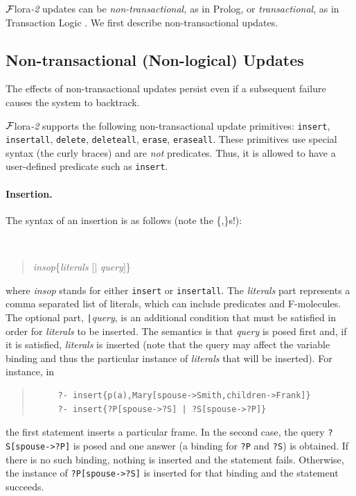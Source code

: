 \documentclass[11pt]{article}
\newcommand{\FLORA}{{\mbox{\sc ${\cal F}${lora}\rm\emph{-2}}}\xspace}
\begin{document}
\FLORA updates can be \emph{non-transactional,} as in Prolog, or
\emph{transactional}, as in Transaction Logic
\cite{trans-chapter-98,trans-tcs94}.  We first describe non-transactional
updates.


\subsection{Non-transactional (Non-logical) Updates}
\label{sec:non-transactional-updates}

%
The effects of non-transactional updates persist even if a subsequent failure
causes the system to backtrack.

\FLORA supports the following non-transactional update primitives:
{\tt insert}, {\tt insertall}, {\tt delete}, {\tt deleteall},
{\tt erase}, {\tt eraseall}. These primitives use special syntax (the curly
braces) and are \emph{not} predicates. Thus, it is allowed to have a
user-defined predicate such as {\tt insert}.

%
\paragraph{Insertion.} The syntax of an insertion is as follows (note the
\{,\}s!):
{\tt
\begin{quote}
\emph{insop}\{\emph{literals} [| \emph{query}]\}
\end{quote}
}
\noindent
where {\it insop} stands for either {\tt insert} or {\tt insertall}.
The
{\it literals} part represents a comma separated list of literals,
which can include
predicates and \mbox{F-molecules}. The optional part, {\tt |}{\it query},
is an additional condition that must be satisfied in order for
\emph{literals} to be inserted.
The semantics is that \emph{query} is posed first and, if it is
satisfied, \emph{literals} is inserted (note that the query may affect the
variable binding and thus the particular instance of \emph{literals} that
will be inserted). For instance, in
\begin{quote}
\begin{verbatim}
     ?- insert{p(a),Mary[spouse->Smith,children->Frank]}
     ?- insert{?P[spouse->?S] | ?S[spouse->?P]}
\end{verbatim}
\end{quote}
the first statement inserts a particular frame. In the second case, the
query {\tt ?S[spouse->?P]} is posed and one answer (a binding for {\tt ?P} and
{\tt ?S}) is obtained. If there is no such binding, nothing is inserted and
the statement fails. Otherwise, the instance of {\tt ?P[spouse->?S]} is
inserted for that binding and the statement succeeds.
\end{document}
